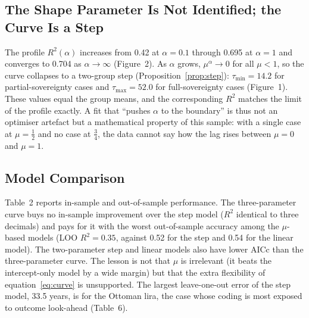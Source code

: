 \documentclass[11pt,letterpaper]{article}
\theoremstyle{definition}
\theoremstyle{plain}
\begin{document}
\subsection{The Shape Parameter Is Not Identified; the Curve Is a Step}\label{sec:shape}
The profile $R^2(\alpha)$ increases from 0.42 at $\alpha=0.1$ through 0.695 at $\alpha=1$ and converges to 0.704 as $\alpha\to\infty$ (Figure~2). As $\alpha$ grows, $\mu^\alpha\to0$ for all $\mu<1$, so the curve collapses to a two-group step (Proposition~\ref{prop:step}): $\tau_{\min}=14.2$ for partial-sovereignty cases and $\tau_{\max}=52.0$ for full-sovereignty cases (Figure~1). These values equal the group means, and the corresponding $R^2$ matches the limit of the profile exactly. A fit that ``pushes $\alpha$ to the boundary'' is thus not an optimiser artefact but a mathematical property of this sample: with a single case at $\mu=\tfrac12$ and no case at $\tfrac34$, the data cannot say how the lag rises between $\mu=0$ and $\mu=1$.

\subsection{Model Comparison}\label{sec:models}
Table~2 reports in-sample and out-of-sample performance. The three-parameter curve buys no in-sample improvement over the step model ($R^2$ identical to three decimals) and pays for it with the worst out-of-sample accuracy among the $\mu$-based models (LOO $R^2=0.35$, against 0.52 for the step and 0.54 for the linear model). The two-parameter step and linear models also have lower AICc than the three-parameter curve. The lesson is not that $\mu$ is irrelevant (it beats the intercept-only model by a wide margin) but that the extra flexibility of equation~\eqref{eq:curve} is unsupported. The largest leave-one-out error of the step model, 33.5 years, is for the Ottoman lira, the case whose coding is most exposed to outcome look-ahead (Table~6).
\end{document}
